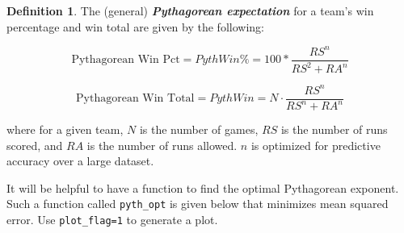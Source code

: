 \documentclass[
  11pt,
]{book}
\theoremstyle{definition}
\newtheorem{definition}{Definition}[chapter]
\theoremstyle{definition}
\theoremstyle{definition}
\theoremstyle{definition}
\theoremstyle{remark}
\begin{document}
\begin{definition}
The (general) \textbf{\emph{Pythagorean expectation}} for a team's win percentage and win total are given by the following:

\[\text{Pythagorean Win Pct} = PythWin\% = 100 * \frac{RS^n}{RS^2 + RA^n}\]

\[\text{Pythagorean Win Total} = PythWin = N \cdot \frac{RS^n}{RS^n + RA^n}\]

where for a given team, \(N\) is the number of games, \(RS\) is the number of runs scored, and \(RA\) is the number of runs allowed. \(n\) is optimized for predictive accuracy over a large dataset.
\end{definition}

It will be helpful to have a function to find the optimal Pythagorean exponent. Such a function called \texttt{pyth\_opt} is given below that minimizes mean squared error. Use \texttt{plot\_flag=1} to generate a plot.
\end{document}

